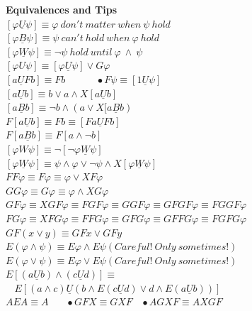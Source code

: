 \documentclass{article}
\begin{document}
\begin{multicols}{4}
\textbf{Equivalences and Tips} \\
$[\varphi \underline{U} \psi] \equiv \varphi\ don't\ matter\ when\ \psi\ hold $ \\
$[\varphi \underline{B} \psi] \equiv \psi\ can't\ hold\ when\ \varphi\ hold $ \\
$[\varphi \underline{W} \psi] \equiv \neg\psi\ hold\ until\ \varphi\ \wedge\ \psi $ \\
$[\varphi U \psi] \equiv [\varphi \underline{U} \psi] \vee G\varphi$ \\
$[a \underline{U} Fb] \equiv Fb\ \ \ \ \ \ \ \ \ \ \ \ \ \ \bullet F\psi \equiv [1 \underline{U} \psi] $ \\
$[a \underline{U} b] \equiv b \vee a \wedge X[a \underline{U} b]$ \\
$[a \underline{B} b] \equiv \neg b \wedge (a \vee X[a \underline{B} b)$ \\
$F[a \underline{U} b] \equiv Fb \equiv [Fa \underline{U} Fb] $ \\
$F[a \underline{B} b] \equiv F[a \wedge \neg b] $ \\
$[\varphi W \psi] \equiv \neg[\neg\varphi \underline{W} \psi]$ \\
$[\varphi \underline{W} \psi] \equiv \psi \wedge \varphi \vee \neg\psi \wedge X[\varphi \underline{W} \psi]$ \\
$FF\varphi \equiv F\varphi \equiv \varphi \vee XF\varphi$ \\ 
$GG\varphi \equiv G\varphi \equiv \varphi \wedge XG\varphi $\\
$GF\varphi \equiv XGF\varphi\equiv FGF\varphi \equiv GGF\varphi\equiv GFGF\varphi \equiv FGGF\varphi$\\
$FG\varphi\equiv XFG\varphi \equiv FFG\varphi \equiv GFG\varphi \equiv GFFG\varphi \equiv FGFG\varphi$ \\
$GF(x \vee y) \equiv GFx \vee GFy $ \\
$E(\varphi \wedge \psi) \equiv E\varphi \wedge E \psi (Careful!\ Only\ sometimes!) $ \\
$E(\varphi \vee \psi) \equiv E\varphi \vee E\psi (Careful!\ Only\ sometimes!)$ \\
$E[(a \underline{U} b) \wedge (c \underline{U} d)] \equiv $ \\
$\ \ \ \ E[(a \wedge c) \underline{U} (b \wedge E(c \underline{U} d) \vee d \wedge E(a \underline{U} b))] $ \\
$AEA \equiv A\ \ \ \ \ \ \ \ \bullet GFX \equiv GXF \ \ \ \ \bullet AGXF\equiv AXGF$ \\

\end{multicols}
\end{document}
